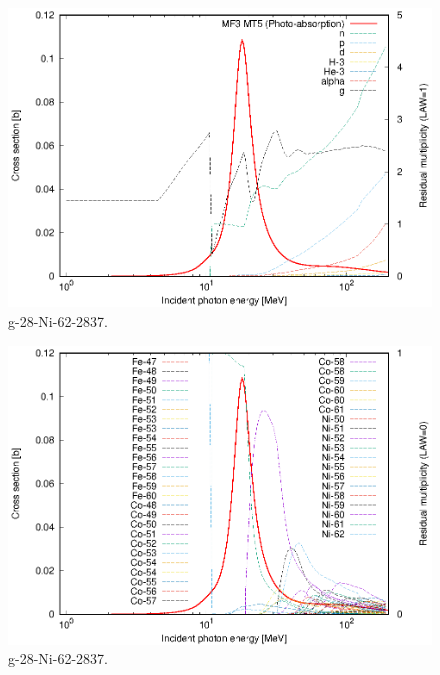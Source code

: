 \begin{figure}
 \includegraphics[width=\linewidth]{eps/g_28-Ni-62_2837.eps}
  \caption{g-28-Ni-62-2837.}
\end{figure}
\begin{figure}
 \includegraphics[width=\linewidth]{eps-law0/g_28-Ni-62_2837.eps}
 \caption{g-28-Ni-62-2837.}
\end{figure}
\newpage \clearpage

